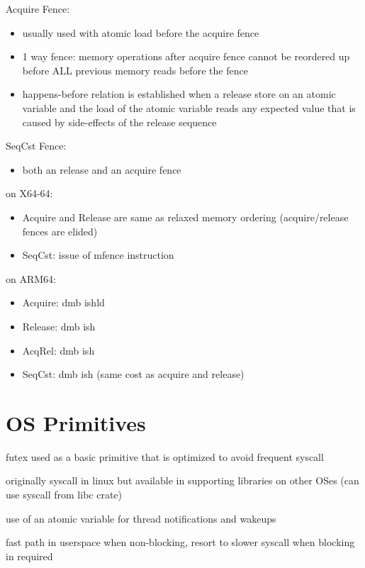\documentclass[8pt]{extarticle}
\begin{document}
\begin{multicols*}{2}
    Acquire Fence: 
    \begin{itemize}
    \item usually used with atomic load before the acquire fence
    \item 1 way fence: memory operations after acquire fence cannot be reordered up before ALL previous memory reads before the fence
    \item happens-before relation is established when a release store on an atomic variable and the load of the atomic variable reads any expected value that is caused by side-effects of the release sequence
    \end{itemize}

    SeqCst Fence:
    \begin{itemize}
      \item both an release and an acquire fence
    \end{itemize}  

    on X64-64:
    \begin{itemize}
    \item Acquire and Release are same as relaxed memory ordering (acquire/release fences are elided)
    \item SeqCst: issue of mfence instruction
    \end{itemize}
  
    on ARM64:
    \begin{itemize}
    \item Acquire: dmb ishld
    \item Release: dmb ish
    \item AcqRel: dmb ish
    \item SeqCst: dmb ish (same cost as acquire and release)
    \end{itemize}

    \vfill\null
    \columnbreak
        
    \section{OS Primitives}

    futex used as a basic primitive that is optimized to avoid frequent syscall

    originally syscall in linux but available in supporting libraries on other OSes (can use syscall from libc crate)

    use of an atomic variable for thread notifications and wakeups

    fast path in userspace when non-blocking, resort to slower syscall when blocking in required


\end{multicols*}
\end{document}
